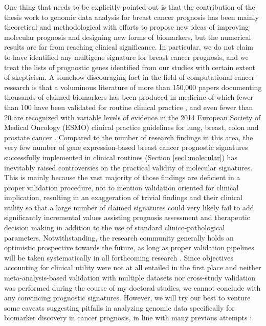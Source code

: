 One thing that needs to be explicitly pointed out is that the contribution of the thesis work to genomic data analysis for breast cancer prognosis has been mainly theoretical and methodological with efforts to propose new ideas of improving molecular prognosis and designing new forms of biomarkers, but the numerical results are far from reaching clinical significance. In particular, we do not claim to have identified any multigene signature for breast cancer prognosis, and we treat the lists of prognostic genes identified from our studies with certain extent of skepticism. A somehow discouraging fact in the field of computational cancer research is that a voluminous literature of more than 150,000 papers documenting thousands of claimed biomarkers has been produced in medicine of which fewer than 100 have been validated for routine clinical practice \cite{Poste2011Bring}, and even fewer than 20 are recognized with variable levels of evidence in the 2014 European Society of Medical Oncology (ESMO) clinical practice guidelines for lung, breast, colon and prostate cancer \cite{Schneider2015Establishing}. Compared to the number of research findings in this area, the very few number of gene expression-based breast cancer prognostic signatures successfully implemented in clinical routines (Section \ref{sec1:molecular}) has inevitably raised controversies on the practical validity of molecular signatures. This is mainly because the vast majority of those findings are deficient in a proper validation procedure, not to mention validation oriented for clinical implication, resulting in an exaggeration of trivial findings and their clinical utility so that a large number of claimed signatures could very likely fail to add significantly incremental values assisting prognosis assessment and therapeutic decision making in addition to the use of standard clinico-pathological parameters. Notwithstanding, the research community generally holds an optimistic prospective towards the future, as long as proper validation pipelines will be taken systematically in all forthcoming research \cite{Michiels2016Statistical}. Since objectives accounting for clinical utility were not at all entailed in the first place and neither meta-analysis-based validation with multiple datasets nor cross-study validation was performed during the course of my doctoral studies, we cannot conclude with any convincing prognostic signatures. However, we will try our best to venture some caveats suggesting pitfalls in analyzing genomic data specifically for biomarker discovery in cancer prognosis, in line with many previous attempts \cite{Ambroise2002Selection, Simon2003Pitfalls, Issaq2011Cancer, Weigelt2012Challenges}:


